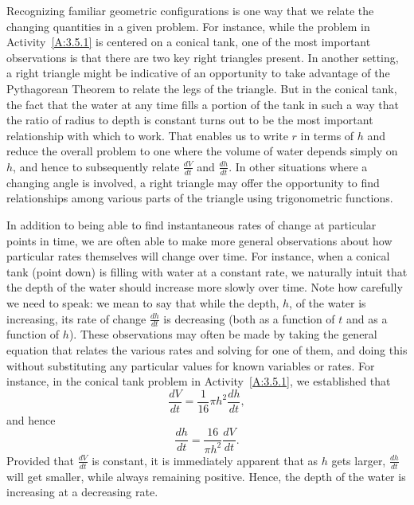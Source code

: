 

Recognizing familiar geometric configurations is one way that we relate the changing quantities in a given problem.  For instance, while the problem in Activity~\ref{A:3.5.1} is centered on a conical tank, one of the most important observations is that there are two key right triangles present.  In another setting, a right triangle might be indicative of an opportunity to take advantage of the Pythagorean Theorem to relate the legs of the triangle.  But in the conical tank, the fact that the water at any time fills a portion of the tank in such a way that the ratio of radius to depth is constant turns out to be the most important relationship with which to work.  That enables us to write $r$ in terms of $h$ and reduce the overall problem to one where the volume of water depends simply on $h$, and hence to subsequently relate $\frac{dV}{dt}$ and $\frac{dh}{dt}$.  In other situations where a changing angle is involved, a right triangle may offer the opportunity to find relationships among various parts of the triangle using trigonometric functions.



In addition to being able to find instantaneous rates of change at particular points in time, we are often able to make more general observations about how particular rates themselves will change over time.  For instance, when a conical tank (point down) is filling with water at a constant rate, we naturally intuit that the depth of the water should increase more slowly over time.  Note how carefully we need to speak:  we mean to say that while the depth, $h$, of the water is increasing, its rate of change $\frac{dh}{dt}$ is decreasing (both as a function of $t$ and as a function of $h$).  These observations may often be made by taking the general equation that relates the various rates and solving for one of them, and doing this without substituting any particular values for known variables or rates.  For instance, in the conical tank problem in Activity~\ref{A:3.5.1}, we established that 
$$\frac{dV}{dt} = \frac{1}{16} \pi h^2 \frac{dh}{dt},$$
and hence
$$\frac{dh}{dt} = \frac{16}{\pi h^2} \frac{dV}{dt}.$$
Provided that $\frac{dV}{dt}$ is constant, it is immediately apparent that as $h$ gets larger, $\frac{dh}{dt}$ will get smaller, while always remaining positive.  Hence, the depth of the water is increasing at a decreasing rate.



